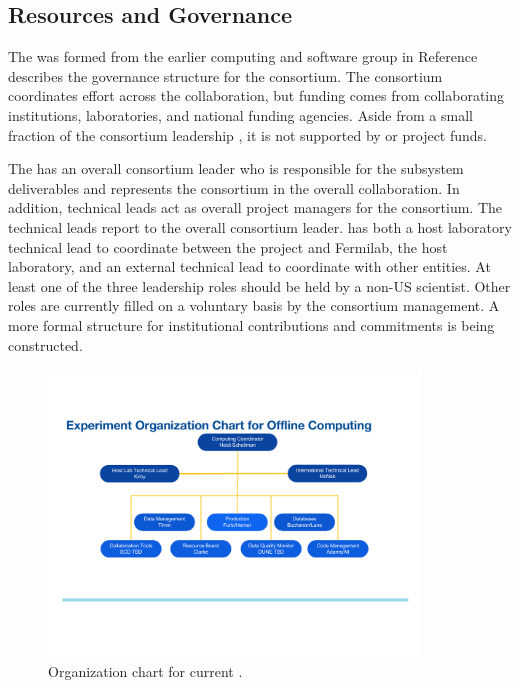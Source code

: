\subsection{Resources and Governance}
\label{ch:exec-comp-gov}

The  was formed from the earlier computing and software group in 
Reference~\cite{bib:docdb12751} describes the governance structure for the consortium.  The consortium coordinates effort across the collaboration, but funding comes from collaborating institutions, laboratories, and national funding agencies. Aside from a small fraction of the consortium leadership , it is not supported by  or  project funds.  

The %
 has an overall consortium leader %
who is responsible for the subsystem deliverables and represents the consortium in the overall  collaboration.
In addition, technical leads act as overall project managers for the consortium. The technical leads report to the overall consortium leader.
 has both a host laboratory technical lead to coordinate between the  project and Fermilab, the host laboratory, and an external technical lead to coordinate with other entities.
At least one of the three leadership roles should be held by a non-US scientist. 
Other roles are currently filled on a voluntary basis by the consortium management.  A more formal structure for institutional contributions and commitments is being constructed. 


\begin{figure}[htp]
\centering
\includegraphics[height=3in]{graphics/comp_Org_Chart.pdf}
\caption[Organization chart for current ]{Organization chart for current . }
\label{fig:ch-exec-comp-org}
\end{figure}

